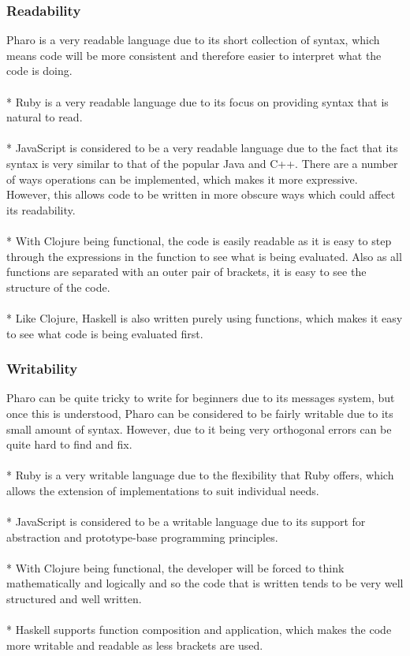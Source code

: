 \subsubsection*{Readability}
Pharo is a very readable language due to its short collection of syntax, which means code will be more consistent and therefore easier to interpret what the code is doing.\\\\*
Ruby is a very readable language due to its focus on providing syntax that is natural to read.\\\\*
JavaScript is considered to be a very readable language due to the fact that its syntax is very similar to that of the popular Java and C++. There are a number of ways operations can be implemented, which makes it more expressive. However, this allows code to be written in more obscure ways which could affect its readability.\\\\*
With Clojure being functional, the code is easily readable as it is easy to step through the expressions in the function to see what is being evaluated. Also as all functions are separated with an outer pair of brackets, it is easy to see the structure of the code.\\\\*
Like Clojure, Haskell is also written purely using functions, which makes it easy to see what code is being evaluated first.
\subsubsection*{Writability}
Pharo can be quite tricky to write for beginners due to its messages system, but once this is understood, Pharo can be considered to be fairly writable due to its small amount of syntax. However, due to it being very orthogonal errors can be quite hard to find and fix.\\\\*
Ruby is a very writable language due to the flexibility that Ruby offers, which allows the extension of implementations to suit individual needs.\\\\*
JavaScript is considered to be a writable language due to its support for abstraction and prototype-base programming principles.\\\\*
With Clojure being functional, the developer will be forced to think mathematically and logically and so the code that is written tends to be very well structured and well written.\\\\*
Haskell supports function composition and application, which makes the code more writable and readable as less brackets are used.
